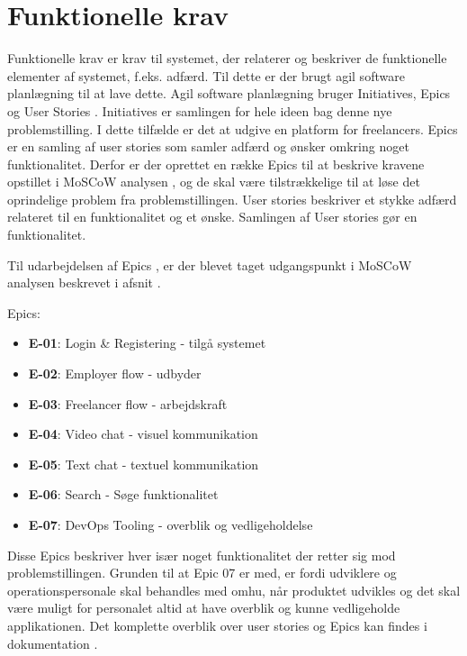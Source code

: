 \section{Funktionelle krav}

Funktionelle krav er krav til systemet, der relaterer og beskriver de funktionelle elementer af systemet, f.eks. adfærd. Til dette er der brugt agil software planlægning til at lave dette. Agil software planlægning bruger Initiatives, Epics og User Stories . Initiatives er samlingen for hele ideen bag denne nye problemstilling. I dette tilfælde er det at udgive en platform for freelancers. Epics er en samling af user stories som samler adfærd og ønsker omkring noget funktionalitet. Derfor er der oprettet en række Epics til at beskrive kravene opstillet i MoSCoW analysen \cite[MoSCoW]{converge-terms}, og de skal være tilstrækkelige til at løse det oprindelige problem fra problemstillingen. User stories beskriver et stykke adfærd relateret til en funktionalitet og et ønske. Samlingen af User stories gør en funktionalitet.

Til udarbejdelsen af Epics \cite[Epic]{converge-terms}, er der blevet taget udgangspunkt i MoSCoW analysen beskrevet i afsnit \cite[Overordnede krav]{doocumentation-kravspec}.

Epics:

\begin{itemize}
  \item \textbf{E-01}: Login \& Registering - tilgå systemet
  \item \textbf{E-02}: Employer flow - udbyder
  \item \textbf{E-03}: Freelancer flow - arbejdskraft
  \item \textbf{E-04}: Video chat - visuel kommunikation
  \item \textbf{E-05}: Text chat - textuel kommunikation
  \item \textbf{E-06}: Search - Søge funktionalitet
  \item \textbf{E-07}: DevOps Tooling - overblik og vedligeholdelse 
\end{itemize}

Disse Epics beskriver hver især noget funktionalitet der retter sig mod problemstillingen. Grunden til at Epic 07 er med, er fordi udviklere og operationspersonale skal behandles med omhu, når produktet udvikles og det skal være muligt for personalet altid at have overblik og kunne vedligeholde applikationen. Det komplette overblik over user stories og Epics kan findes i dokumentation \cite[Funktionelle krav]{documentation-kravspec}.
